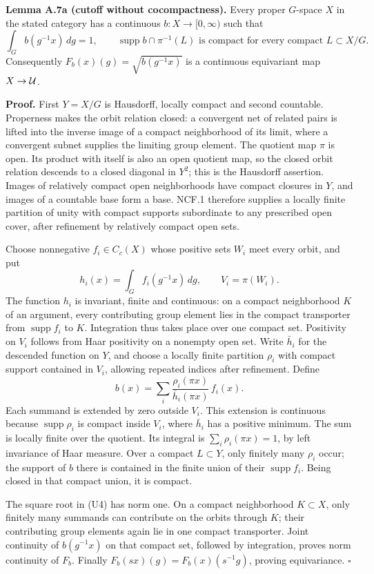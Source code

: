 \documentclass[
  11pt,
]{article}
\begin{document}
\textbf{Lemma A.7a (cutoff without cocompactness).} Every proper
\(G\)-space \(X\) in the stated category has a continuous
\(b:X\to[0,\infty)\) such that \[
 \int_G b(g^{-1}x)\,dg=1,\qquad
 \operatorname{supp}b\cap\pi^{-1}(L)\text{ is compact for every compact }
 L\subset X/G.
 \tag{U4}
\] Consequently \(F_b(x)(g)=\sqrt{b(g^{-1}x)}\) is a continuous
equivariant map \(X\to{\cal U}\).

\textbf{Proof.} First \(Y=X/G\) is Hausdorff, locally compact and second
countable. Properness makes the orbit relation closed: a convergent net
of related pairs is lifted into the inverse image of a compact
neighborhood of its limit, where a convergent subnet supplies the
limiting group element. The quotient map \(\pi\) is open. Its product
with itself is also an open quotient map, so the closed orbit relation
descends to a closed diagonal in \(Y^2\); this is the Hausdorff
assertion. Images of relatively compact open neighborhoods have compact
closures in \(Y\), and images of a countable base form a base. NCF.1
therefore supplies a locally finite partition of unity with compact
supports subordinate to any prescribed open cover, after refinement by
relatively compact open sets.

Choose nonnegative \(f_i\in C_c(X)\) whose positive sets \(W_i\) meet
every orbit, and put \[
 h_i(x)=\int_G f_i(g^{-1}x)\,dg,\qquad
 V_i=\pi(W_i).
\] The function \(h_i\) is invariant, finite and continuous: on a
compact neighborhood \(K\) of an argument, every contributing group
element lies in the compact transporter from \(\operatorname{supp}f_i\)
to \(K\). Integration thus takes place over one compact set. Positivity
on \(V_i\) follows from Haar positivity on a nonempty open set. Write
\(\bar h_i\) for the descended function on \(Y\), and choose a locally
finite partition \(\rho_i\) with compact support contained in \(V_i\),
allowing repeated indices after refinement. Define \[
 b(x)=\sum_i
       \frac{\rho_i(\pi x)}{\bar h_i(\pi x)}\,f_i(x).
 \tag{U5}
\] Each summand is extended by zero outside \(V_i\). This extension is
continuous because \(\operatorname{supp}\rho_i\) is compact inside
\(V_i\), where \(\bar h_i\) has a positive minimum. The sum is locally
finite over the quotient. Its integral is \(\sum_i\rho_i(\pi x)=1\), by
left invariance of Haar measure. Over a compact \(L\subset Y\), only
finitely many \(\rho_i\) occur; the support of \(b\) there is contained
in the finite union of their \(\operatorname{supp}f_i\). Being closed in
that compact union, it is compact.

The square root in (U4) has norm one. On a compact neighborhood
\(K\subset X\), only finitely many summands can contribute on the orbits
through \(K\); their contributing group elements again lie in one
compact transporter. Joint continuity of \(b(g^{-1}x)\) on that compact
set, followed by integration, proves norm continuity of \(F_b\). Finally
\(F_b(sx)(g)=F_b(x)(s^{-1}g)\), proving equivariance. \(\square\)
\end{document}
